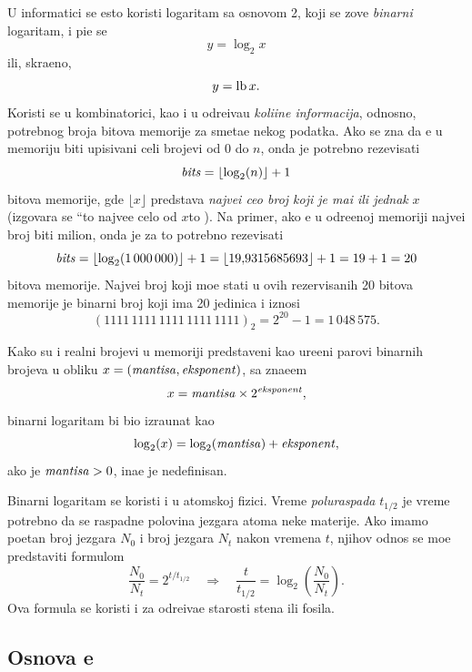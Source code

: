 \documentclass[12pt, twoside, a4paper]{article}
\def\navod#1{\leavevmode\setbox\qqbox\hbox{``}\hbox to \wd\qqbox{,\hss,}#1\hbox to \wd\qqbox{`\hss`}}
\def\logtwo{\log_2}
\def\puta{\times}
\def\.{\smash{,}\vphantom{.}}
\def\e{{\bf e}}
\def\th{t_{1/2}}
\def\sledi{{\quad\Rightarrow\quad}}
\begin{document}
U informatici se {\cv}esto koristi logaritam sa osnovom 2, koji se zove {\sl binarni\/} logaritam,
i pi{\sv}e se
$$
y=\logtwo x
$$
ili, skra{\cc}eno,
$$
y=\mathop{\rm lb} x.
$$
Koristi se u kombinatorici, kao i u odre{\dj}iva{\nj}u {\sl koli{\cv}ine informacija},
odnosno, potrebnog broja bitova me\-mo\-ri\-je za sme{\sv}ta{\nj}e nekog podatka.
Ako se zna da {\cc}e u me\-mo\-ri\-ju biti upisivani celi brojevi od 0 do $n$, onda je potrebno rezevisati
\begin{equation}\label{eq:bits}
  \bits = \lfloor\logtwo(n)\rfloor+1
\end{equation}
bitova memorije, gde $\lfloor x\rfloor$ predstav{\lj}a {\sl najve{\cc}i ceo broj koji je ma{\nj}i ili jednak} $x$
(izgovara se \navod{najve{\cc}e celo od $x$}). 
Na primer, ako {\cc}e u odre{\dj}enoj memoriji najve{\cc}i 
broj biti milion, onda je za to potrebno rezevisati
$$
\bits=\lfloor\logtwo(1\,000\,000)\rfloor+1=\lfloor 19\.9315685693\rfloor+1 = 19+1=20
$$
bitova memorije. Najve{\cc}i broj koji mo{\zv}e stati u ovih rezervisanih 20 bitova memorije je binarni broj koji ima 20 jedinica
i iznosi 
$$
(1111\,1111\,1111\,1111\,1111)_2=
2^{20}-1=1\,048\,575.
$$

Kako su i realni brojevi u memoriji predstav{\lj}eni kao ure{\dj}eni parovi binarnih brojeva u obliku
$x=({\it mantisa},{\it eksponent})$, sa zna{\cv}e{\nj}em
$$
x=\mant\puta2^\expo,
$$
binarni logaritam bi bio izra{\cv}unat kao
$$
\logtwo(x)=\logtwo(\mant)+\expo,
$$
ako je ${\it mantisa}>0$, ina{\cv}e je nedefinisan.

\smallskip

Binarni logaritam se koristi i u atomskoj fizici.
Vreme {\sl poluraspada\/} $\th$ je vreme potrebno da se raspadne polovina jezgara atoma neke materije. 
Ako imamo po{\cv}etan broj jezgara $N_0$ i broj jezgara $N_t$ nakon vremena $t$, njihov odnos
se mo{\zv}e pred\-sta\-vi\-ti formulom
\begin{equation}
\label{eq:halftime}
\frac{N_0}{N_t}=2^{t/\th}\sledi \frac{t}{\th}=\logtwo\left( \frac{N_0}{N_t} \right).
\end{equation}
Ova formula se koristi i za odre{\dj}iva{\nj}e starosti stena ili fosila.



\subsection{Osnova \e}\index{e@$\e$}
\end{document}
